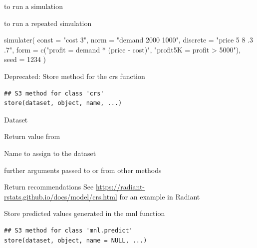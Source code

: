 \documentclass[a4paper]{book}
\begin{document}
%
\begin{SeeAlso}
 to run a simulation

 to run a repeated simulation
\end{SeeAlso}
%
\begin{Examples}
\begin{ExampleCode}
simulater(
  const = "cost 3",
  norm = "demand 2000 1000",
  discrete = "price 5 8 .3 .7",
  form = c("profit = demand * (price - cost)", "profit5K = profit > 5000"),
  seed = 1234
) %

\end{ExampleCode}
\end{Examples}
%
\begin{Description}
Deprecated: Store method for the crs function
\end{Description}
%
\begin{Usage}
\begin{verbatim}
## S3 method for class 'crs'
store(dataset, object, name, ...)
\end{verbatim}
\end{Usage}
%
\begin{Arguments}
\begin{ldescription}
\item[\code{dataset}] Dataset

\item[\code{object}] Return value from 

\item[\code{name}] Name to assign to the dataset

\item[\code{...}] further arguments passed to or from other methods
\end{ldescription}
\end{Arguments}
%
\begin{Details}
Return recommendations See \url{https://radiant-rstats.github.io/docs/model/crs.html} for an example in Radiant
\end{Details}
%
\begin{Description}
Store predicted values generated in the mnl function
\end{Description}
%
\begin{Usage}
\begin{verbatim}
## S3 method for class 'mnl.predict'
store(dataset, object, name = NULL, ...)
\end{verbatim}
\end{Usage}
\end{document}

